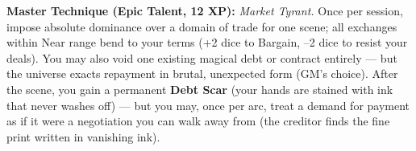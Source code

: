 \begin{tcolorbox}[colback=black!5,colframe=gold!80!black,title=\textbf{Contract Monk (Maelstraeus)},breakable]
  \vspace{2mm}
  \noindent\textbf{Master Technique (Epic Talent, 12 XP):}
  \textit{Market Tyrant.} Once per session, impose absolute dominance over a domain of trade for one scene; all exchanges within Near range bend to your terms (+2 dice to Bargain, --2 dice to resist your deals). You may also void one existing magical debt or contract entirely --- but the universe exacts repayment in brutal, unexpected form (GM's choice). After the scene, you gain a permanent \textbf{Debt Scar} (your hands are stained with ink that never washes off) --- but you may, once per arc, treat a demand for payment as if it were a negotiation you can walk away from (the creditor finds the fine print written in vanishing ink).
\end{tcolorbox}